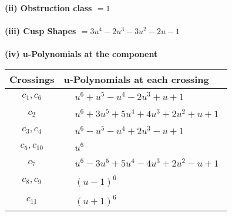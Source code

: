 \documentclass[1p]{elsarticle_modified}
\theoremstyle{definition}
\begin{document}
\flushleft \textbf{(ii) Obstruction class $= 1$}\\~\\
\flushleft \textbf{(iii) Cusp Shapes $= 3 u^4-2 u^3-3 u^2-2 u-1$}\\~\\
\newpage\renewcommand{\arraystretch}{1}
\flushleft \textbf{(iv) u-Polynomials at the component}\newline \\
\begin{tabular}{m{50pt}|m{274pt}}
Crossings & \hspace{64pt}u-Polynomials at each crossing \\
\hline $$\begin{aligned}c_{1},c_{6}\end{aligned}$$&$\begin{aligned}
&u^6+u^5- u^4-2 u^3+u+1
\end{aligned}$\\
\hline $$\begin{aligned}c_{2}\end{aligned}$$&$\begin{aligned}
&u^6+3 u^5+5 u^4+4 u^3+2 u^2+u+1
\end{aligned}$\\
\hline $$\begin{aligned}c_{3},c_{4}\end{aligned}$$&$\begin{aligned}
&u^6- u^5- u^4+2 u^3- u+1
\end{aligned}$\\
\hline $$\begin{aligned}c_{5},c_{10}\end{aligned}$$&$\begin{aligned}
&u^6
\end{aligned}$\\
\hline $$\begin{aligned}c_{7}\end{aligned}$$&$\begin{aligned}
&u^6-3 u^5+5 u^4-4 u^3+2 u^2- u+1
\end{aligned}$\\
\hline $$\begin{aligned}c_{8},c_{9}\end{aligned}$$&$\begin{aligned}
&(u-1)^6
\end{aligned}$\\
\hline $$\begin{aligned}c_{11}\end{aligned}$$&$\begin{aligned}
&(u+1)^6
\end{aligned}$\\
\hline
\end{tabular}\\~\\
\end{document}
